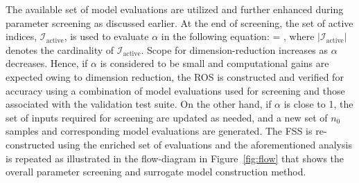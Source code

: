 The available set of model evaluations are utilized and further enhanced during
parameter screening as discussed earlier.  At the end of screening, the set of
active indices, $\mathcal{I}_\text{active}$, is used to evaluate $\alpha$ in the
following equation: 
%
\be
\alpha = ,
\label{eq:alpha}
\ee
%
where $|\mathcal{I}_\text{active}|$ denotes the cardinality of
$\mathcal{I}_\text{active}$.  Scope for dimension-reduction increases as
$\alpha$ decreases.  Hence, if $\alpha$ is considered to be small and
computational gains are expected owing to dimension reduction, the ROS is
constructed and verified for accuracy using a combination of model evaluations
used for screening and those associated with the validation test suite.  On the
other hand, if $\alpha$ is close to 1, the set of inputs required for screening are
 updated as needed, and a
new set of $n_0$ samples and corresponding model evaluations are generated. The
FSS is re-constructed using the enriched set of evaluations and the
aforementioned analysis is repeated as illustrated in the flow-diagram
in Figure~\ref{fig:flow} that shows the overall 
parameter screening and surrogate model construction method.




